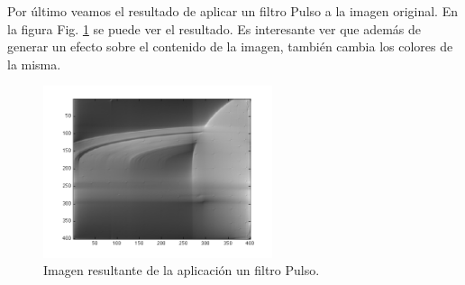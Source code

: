 \documentclass[11pt,a4paper]{emulateapj}
\begin{document}
Por último veamos el resultado de aplicar un filtro Pulso a la imagen original. En la figura Fig. \ref{fig:imagenpulse} se puede ver el resultado. Es interesante ver que además de generar un efecto sobre el contenido de la imagen, también cambia los colores de la misma.
\begin{figure}[ht!]
     \includegraphics[width=254px]{images/pulse.png}
       \caption{Imagen resultante de la aplicación un filtro Pulso.}
     \label{fig:imagenpulse}
\end{figure} 

%

\end{document}
